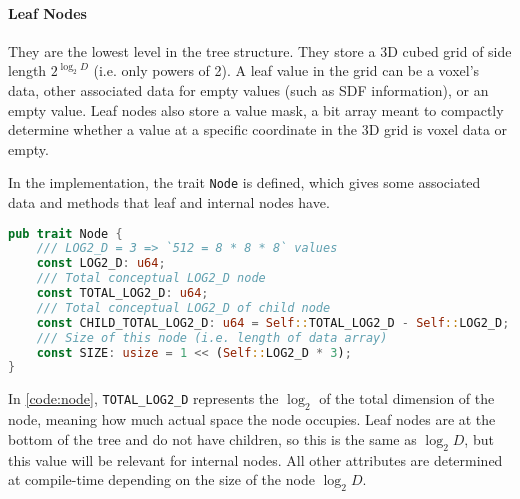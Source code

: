 \paragraph{Leaf Nodes} They are the lowest level in the tree structure. They store a 3D cubed grid of side length $2^{\log_{2} D}$ (i.e. only powers of 2). A leaf value in the grid can be a voxel's data, other associated data for empty values (such as SDF information), or an empty value.
Leaf nodes also store a value mask, a bit array meant to compactly determine whether a value at a specific coordinate in the 3D grid is voxel data or empty.

In the implementation, the trait \verb|Node| is defined, which gives some associated data and methods that leaf and internal nodes have.

\begin{lstlisting}[language=rust,caption={\texttt{Node} trait definition},captionpos=b,label={code:node}]
pub trait Node {
    /// LOG2_D = 3 => `512 = 8 * 8 * 8` values
    const LOG2_D: u64;
    /// Total conceptual LOG2_D node
    const TOTAL_LOG2_D: u64;
    /// Total conceptual LOG2_D of child node
    const CHILD_TOTAL_LOG2_D: u64 = Self::TOTAL_LOG2_D - Self::LOG2_D;
    /// Size of this node (i.e. length of data array)
    const SIZE: usize = 1 << (Self::LOG2_D * 3);
}
\end{lstlisting}

In \cref{code:node}, \verb|TOTAL_LOG2_D| represents the $\log_{2}$ of the total dimension of the node, meaning how much actual space the node occupies. Leaf nodes are at the bottom of the tree and do not have children, so this is the same as $\log_{2} D$, but this value will be relevant for internal nodes. All other attributes are determined at compile-time depending on the size of the node $\log_{2} D$.

